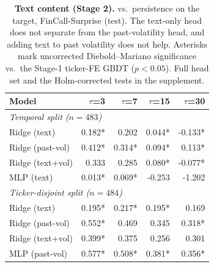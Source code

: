 \begin{table}[t]
\centering
\small
\setlength{\tabcolsep}{4pt}
\begin{tabular}{lrrrr}
\toprule
Model & $\tau$=3 & $\tau$=7 & $\tau$=15 & $\tau$=30 \\
\midrule
\multicolumn{5}{l}{\textit{Temporal split ($n{=}483$)}}\\
Ridge (text)      & 0.182* & 0.202 & 0.044* & -0.133* \\
Ridge (past-vol)  & 0.412* & 0.314* & 0.094* & 0.113* \\
Ridge (text+vol)  & 0.333 & 0.285 & 0.080* & -0.077* \\
MLP (text)        & 0.013* & 0.069* & -0.253 & -1.202 \\
\midrule
\multicolumn{5}{l}{\textit{Ticker-disjoint split ($n{=}484$)}}\\
Ridge (text)      & 0.195* & 0.217* & 0.195* & 0.169 \\
Ridge (past-vol)  & 0.552* & 0.469 & 0.345 & 0.318* \\
Ridge (text+vol)  & 0.399* & 0.375 & 0.256 & 0.301 \\
MLP (past-vol)    & 0.577* & 0.508* & 0.381* & 0.356* \\
\bottomrule
\end{tabular}
\caption{\textbf{Text content (Stage 2).} \Rtwo{} vs.\ persistence on the \dv{}
target, FinCall-Surprise (test). The text-only head does not separate from the
past-volatility head, and adding text to past volatility does not help. Asterisks
mark uncorrected Diebold--Mariano significance vs.\ the Stage-1 ticker-FE GBDT
($p<0.05$). Full head set and the Holm-corrected tests in the supplement.}
\label{tab:text}
\end{table}
